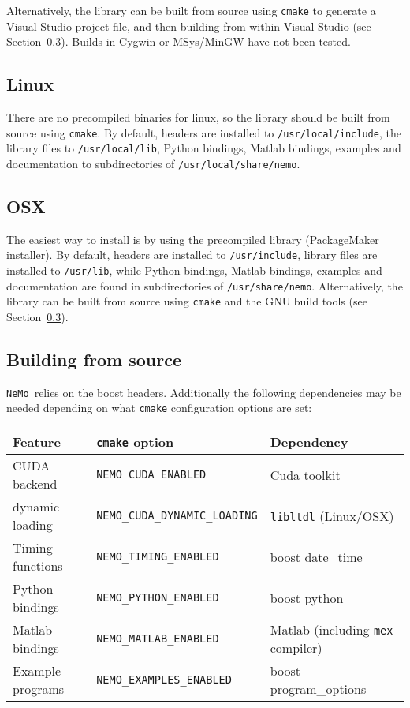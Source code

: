 \documentclass[a4paper]{article}
\newcommand{\nemo}{\texttt{NeMo}}
\newcommand{\command}[1]{\texttt{#1}}
\newcommand{\file}[1]{\texttt{#1}}
\newcommand{\directory}[1]{\texttt{#1}}
\begin{document}
Alternatively, the library can be built from source using \command{cmake} to generate a Visual Studio project file,
	and then building from within Visual Studio (see Section~\ref{source_build}).
Builds in Cygwin or MSys/MinGW have not been tested.

\subsection{Linux}

There are no precompiled binaries for linux,
	so the library should be built from source using \command{cmake}.
By default,
	headers are installed to \file{/usr/local/include},
	the library files to \file{/usr/local/lib},
	Python bindings, Matlab bindings, examples and documentation to subdirectories of \directory{/usr/local/share/nemo}.

\subsection{OSX}

The easiest way to install is by using the precompiled library (PackageMaker installer).
By default,
	headers are installed to \directory{/usr/include},
	library files are installed to \directory{/usr/lib},
	while
	Python bindings, Matlab bindings, examples and documentation are found in subdirectories of \directory{/usr/share/nemo}.
Alternatively, the library can be built from source using \command{cmake} and the GNU build tools (see Section~\ref{source_build}).

\subsection{Building from source}
\label{source_build}

\nemo\ relies on the boost headers.
Additionally the following dependencies may be needed depending on what \command{cmake} configuration options are set: 

\begin{tabular}{p{}lp{}}
\hline
Feature & \command{cmake} option & Dependency \\
\hline
CUDA backend & \command{NEMO\_CUDA\_ENABLED} & Cuda toolkit \\
\hspace{2em}dynamic loading & \command{NEMO\_CUDA\_DYNAMIC\_LOADING} & \command{libltdl} (Linux/OSX) \\
Timing functions & \command{NEMO\_TIMING\_ENABLED} & boost date\_time \\
Python bindings & \command{NEMO\_PYTHON\_ENABLED} & boost python \\
Matlab bindings & \command{NEMO\_MATLAB\_ENABLED} & Matlab (including \command{mex} compiler) \\
Example programs & \command{NEMO\_EXAMPLES\_ENABLED} & boost program\_options \\ 
\hline
\end{tabular}
\end{document}
